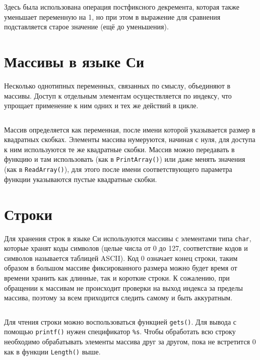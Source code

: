 Здесь была использована операция постфиксного декремента, которая также
уменьшает переменную на 1, но при этом в выражение для сравнения подставляется
старое значение (ещё до уменьшения).


\section{Массивы в языке Си}

Несколько однотипных переменных, связанных по смыслу, объединяют в массивы.
Доступ к отдельным элементам осуществляется по индексу, что упрощает
применение к ним одних и тех же действий в цикле.
%
\inputminted{c}{samples/array.c}

Массив определяется как переменная, после имени которой указывается размер в
квадратных скобках. Элементы массива нумеруются, начиная с нуля, для доступа к
ним используются те же квадратные скобки. Массив можно передавать в функцию и
там использовать (как в \verb|PrintArray()|) или даже менять значения
(как в \verb|ReadArray()|), для этого после имени соответствующего параметра
функции указываются пустые квадратные скобки.


\section{Строки}

Для хранения строк в языке Си используются массивы с элементами типа
\texttt{char}, которые хранят коды символов (целые числа от 0 до 127, соответствие кодов и символов называется таблицей ASCII). Код 0
означает конец строки, таким образом в большом массиве фиксированного размера
можно будет время от времени хранить как длинные, так и короткие строки. К
сожалению, при обращении к массивам не происходит проверки на выход индекса за
пределы массива, поэтому за всем приходится следить самому и быть аккуратным.
%
\inputminted{c}{samples/string.c}

Для чтения строки можно воспользоваться функцией \texttt{gets()}. Для вывода
с помощью \texttt{printf()} нужен спецификатор \verb|%s|. Чтобы обработать
всю строку необходимо обрабатывать элементы массива друг за другом, пока не
встретится 0 как в функции \texttt{Length()} выше.

